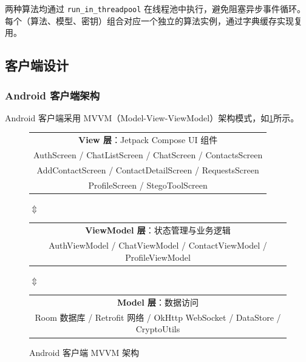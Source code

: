 两种算法均通过 \texttt{run\_in\_threadpool} 在线程池中执行，避免阻塞异步事件循环。每个（算法、模型、密钥）组合对应一个独立的算法实例，通过字典缓存实现复用。

\subsection{客户端设计}

\subsubsection{Android 客户端架构}

Android 客户端采用 MVVM（Model-View-ViewModel）架构模式，如\cref{fig:android_arch}所示。

\begin{figure}[htb!]
    \centering
    \begin{tabular}{|c|}
        \hline
        \textbf{View 层}：Jetpack Compose UI 组件 \\
        AuthScreen / ChatListScreen / ChatScreen / ContactsScreen \\
        AddContactScreen / ContactDetailScreen / RequestsScreen \\
        ProfileScreen / StegoToolScreen \\
        \hline
    \end{tabular}

    \vspace{0.3cm}
    $\Updownarrow$
    \vspace{0.3cm}

    \begin{tabular}{|c|}
        \hline
        \textbf{ViewModel 层}：状态管理与业务逻辑 \\
        AuthViewModel / ChatViewModel / ContactViewModel / ProfileViewModel \\
        \hline
    \end{tabular}

    \vspace{0.3cm}
    $\Updownarrow$
    \vspace{0.3cm}

    \begin{tabular}{|c|}
        \hline
        \textbf{Model 层}：数据访问 \\
        Room 数据库 / Retrofit 网络 / OkHttp WebSocket / DataStore / CryptoUtils \\
        \hline
    \end{tabular}
    \caption{Android 客户端 MVVM 架构}
    \label{fig:android_arch}
\end{figure}

